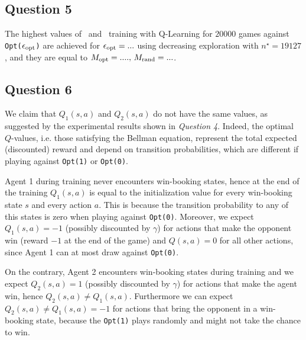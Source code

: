 \documentclass[10pt]{IEEEtran}
\begin{document}
\subsection*{Question 5}
The highest values of \mopt\  and \mrand\  training with Q-Learning for $20000$ games against \texttt{Opt($\epsilon_{\text{opt}}$)} are achieved for \textcolor{red}{$\epsilon_{\text{opt}} = ...$} using decreasing exploration with $n^{\star} = 19127$, and they are equal to \textcolor{red}{$M_{\text{opt}} = ...., \, M_{\text{rand}} = ...$}.

\subsection*{Question 6}
We claim that $Q_1(s,a)$ and $Q_2(s,a)$ do not have the same values, as suggested by the experimental results shown in \emph{Question 4}.
Indeed, the optimal $Q$-values, i.e. those satisfying the Bellman equation, represent the total expected (discounted) reward and depend on transition probabilities, which are different if playing against \texttt{Opt(1)} or \texttt{Opt(0)}. 

Agent 1 during training never encounters win-booking states, hence at the end of the training $Q_1(s,a)$ is equal to the initialization value for every win-booking state $s$ and every action $a$. This is because the transition probability to any of this states is zero when playing against \texttt{Opt(0)}. Moreover, we expect $Q_1(s,a) = -1$ (possibly discounted by $\gamma$) for actions that make the opponent win (reward $-1$ at the end of the game) and $Q(s,a) = 0$ for all other actions, since Agent 1 can at most draw against \texttt{Opt(0)}. 

On the contrary, Agent 2 encounters win-booking states during training and we expect $Q_2(s,a) = 1$ (possibly discounted by $\gamma$) for actions that make the agent win, hence $Q_2(s,a) \neq Q_1(s,a)$. Furthermore we can expect $Q_2(s,a) \neq Q_1(s,a) = -1$ for actions that bring the opponent in a win-booking state, because the \texttt{Opt(1)} plays randomly and might not take the chance to win.
\end{document}
